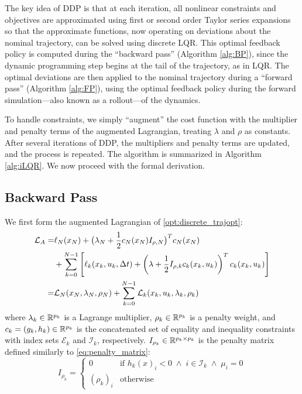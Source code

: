\documentclass[../root.tex]{subfiles}
\begin{document}
The key idea of DDP is that at each iteration, all nonlinear constraints and
objectives are approximated using first or second order Taylor series
expansions so that the approximate functions, now operating on deviations
about the nominal trajectory, can be solved using discrete LQR. This optimal
feedback policy is computed during the ``backward pass'' (Algorithm
\ref{alg:BP}), since the dynamic programming step begins at the tail of the
trajectory, as in LQR. The optimal deviations are then applied to the nominal
trajectory during a ``forward pass'' (Algorithm \ref{alg:FP}), using the
optimal feedback policy during the forward simulation---also known as a
rollout---of the dynamics.

To handle constraints, we simply ``augment'' the cost function with the
multiplier and penalty terms of the augmented Lagrangian, treating $\lambda$
and $\rho$ as constants. After several iterations of DDP, the multipliers and
penalty terms are updated, and the process is repeated. The algorithm is
summarized in Algorithm \ref{alg:iLQR}. We now proceed with the formal
derivation.

\subsection{Backward Pass}

    We first form the augmented Lagrangian of \eqref{opt:discrete_trajopt}:
    \begin{equation}
        \begin{aligned}
            \mathcal{L}_A =& \ell_N(x_N) + \big(\lambda_N + \frac{1}{2} c_N(x_N) I_{\rho,N} \big)^T c_N(x_N) \\
            &+ \sum_{k=0}^{N-1} \left[ \ell_k(x_k,u_k,\Delta t) 
             + \left( \lambda + \frac{1}{2} I_{\rho,k} c_k(x_k,u_k) \right)^T c_k(x_k,u_k) 
            \right] \\
            =& \mathcal{L}_N(x_N,\lambda_N,\rho_N) + \sum_{k=0}^{N-1} \mathcal{L}_k(x_k,u_k,\lambda_k,\rho_k)
        \end{aligned}
    \end{equation}
    where $\lambda_k \in \mathbb{R}^{p_k}$ is a Lagrange multiplier, $\rho_k \in
    \mathbb{R}^{p_k}$ is a penalty weight, and $c_k = (g_k, h_k) \in \mathbb{R}^{p_k}$ is the
    concatenated set of equality and inequality constraints with index sets
    $\mathcal{E}_k$ and $\mathcal{I}_k$, respectively. $I_{\rho_k} \in \mathbb{R}^{p_k
    \times p_k}$ is the penalty matrix defined similarly to \eqref{eq:penalty_matrix}:
    \begin{equation}
        I_{\rho_k} = \begin{cases}
            0 & \text{if } h_k(x)_i < 0 \; \wedge \; i \in \mathcal{I}_k \; \wedge \; \mu_i = 0 \\
            (\rho_k)_i & \text{otherwise}
        \end{cases}
    \end{equation}
\end{document}

